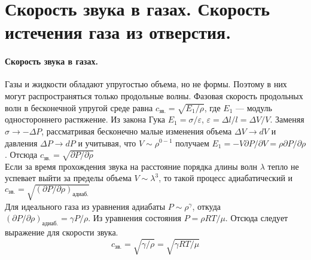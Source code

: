 \section{\normalsize Скорость звука в газах. Скорость истечения газа из отверстия.}
\paragraph{Скорость звука в газах.} Газы и жидкости обладают упругостью объема, но не формы. Поэтому в них могут распространяться только продольные волны. Фазовая скорость продольных волн в бесконечной упругой среде равна $c_\text{зв.}=\sqrt{E_1/\rho}$, где $E_1$ --- модуль одностороннего растяжение. Из закона Гука $E_1=\sigma/\varepsilon$, $\varepsilon=\Delta l/l=\Delta V/V$. Заменяя $\sigma \rightarrow -\Delta P$, рассматривая бесконечно малые изменения объема $\Delta V \rightarrow dV$ и давления $\Delta P \rightarrow dP$ и учитывая, что $V\sim\rho^{0-1}$ получаем $E_1=-V\partial P/\partial V=\rho \partial P/\partial\rho$. Отсюда $c_\text{зв.}=\sqrt{\partial P/\partial\rho}$\\
Если за время прохождения звука на расстояние порядка длины волн $\lambda$ тепло не успевает выйти за пределы объема $V\sim\lambda^3$, то такой процесс адиабатический и $c_\text{зв.}=\sqrt{(\partial P/\partial\rho)_{\text{адиаб.}}}$\\
Для идеального газа из уравнения адиабаты $P\sim\rho^\gamma$, откуда $(\partial P/\partial\rho)_{\text{адиаб.}}=\gamma P/\rho$. Из уравнения состояния $P=\rho RT/\mu$. Отсюда следует выражение для скорости звука.
\[c_\text{зв.}=\sqrt{\gamma {/\rho}}=\sqrt{\gamma RT/\mu}  \]
